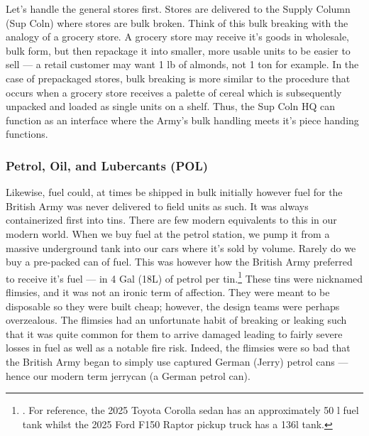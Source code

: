 \documentclass[noraggedright]{turabian-researchpaper}
\newcommand{\Petrol}{Precis of Lecture No. 12:  Petrol}
\newcommand{\SupInWar}{Precis on Lecture ``Supplies in War'', (Part II)}
\begin{document}
Let's handle the general stores first.  Stores are delivered to the Supply
Column (Sup Coln) where stores are bulk broken.  Think of this bulk breaking 
with the analogy of a grocery store.  A grocery store may receive it's goods in 
wholesale, bulk form, but then repackage it into smaller, more usable units to
be easier to sell --- a retail customer may want 1 lb of almonds, not 1 ton
for example.  In the case of prepackaged stores, bulk breaking is more similar
to the procedure that occurs when a grocery store receives a palette of cereal
which is subsequently unpacked and loaded as single units on a shelf.  Thus,
the Sup Coln HQ can function as an interface where the Army's bulk handling 
meets it's piece handing functions.\autocite[\SupInWar][3]{27course}

\subsubsection{Petrol, Oil, and Lubercants (POL)}

Likewise, fuel could, at times be shipped in bulk initially however fuel for
the British Army was never delivered to field units as such.  It was always
containerized first into tins.  There are few modern equivalents to this in
our modern world.  When we buy fuel at the petrol station, we pump it from a 
massive underground tank into our cars where it's sold by volume.  Rarely do
we buy a pre-packed can of fuel.  This was however how the British Army 
preferred to receive it's fuel --- in 4 Gal (18L) of petrol per tin.\footnote
{\cite[\Petrol][3]{27course}.
For reference, the 2025 Toyota Corolla sedan has an approximately 50 l fuel 
tank whilst the 2025 Ford F150 Raptor pickup truck has a 136l tank.}%
These tins were nicknamed flimsies, and it was not an ironic term of affection. 
They were meant to be disposable so they were built cheap; however, the 
design teams were perhaps overzealous.  The flimsies had an unfortunate habit
of breaking or leaking such that it was quite common for them to arrive 
damaged leading to fairly severe losses in fuel as well as a notable fire risk.  
Indeed, the flimsies were so bad that the British Army began to simply use 
captured German (Jerry) petrol cans --- hence our modern term jerrycan 
(a German petrol can).  
\end{document}
